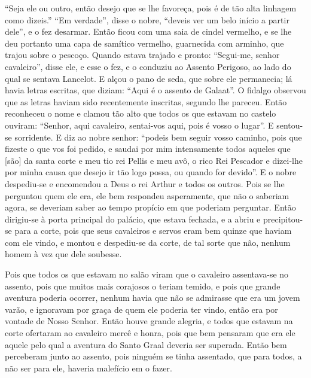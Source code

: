 “Seja ele ou outro, então desejo que se lhe favoreça, pois é de tão alta
linhagem como dizeis.” “Em verdade”, disse o nobre, “deveis ver um belo início
a partir dele”, e o fez desarmar. Então ficou com uma saia de cindel vermelho,
e se lhe deu portanto uma capa de samítico vermelho, guarnecida com arminho,
que trajou sobre o pescoço. Quando estava trajado e pronto: “Segui-me, senhor
cavaleiro”, disse ele, e esse o fez, e o conduziu ao Assento Perigoso, ao lado
do qual se sentava Lancelot. E alçou o pano de seda, que sobre ele permanecia;
lá havia letras escritas, que diziam: “Aqui é o assento de Galaat”. O fidalgo
observou que as letras haviam sido recentemente inscritas, segundo lhe pareceu.
Então reconheceu o nome e clamou tão alto que todos os que estavam no castelo
ouviram: “Senhor, aqui cavaleiro, sentai-vos aqui, pois é vosso o lugar”. E
sentou-se sorridente. E diz ao nobre senhor: “podeis bem seguir vosso caminho,
pois que fizeste o que vos foi pedido, e saudai por mim intensamente todos
aqueles que [são] da santa corte e meu tio rei Pellis e meu avô, o rico Rei Pescador
e dizei-lhe por minha causa que desejo ir tão logo possa, ou quando for
devido”. E o nobre despediu-se e encomendou a Deus o rei Arthur e todos os
outros.  Pois se lhe perguntou quem ele era, ele bem respondeu asperamente, que
não o saberiam agora, se deveriam saber ao tempo propício em que poderiam
perguntar. Então dirigiu-se à porta principal do palácio, que estava fechada, e
a abriu e precipitou-se para a corte, pois que seus cavaleiros e servos eram
bem quinze que haviam com ele vindo, e montou e despediu-se da corte, de tal
sorte que não, nenhum homem à vez que dele soubesse. 

Pois que todos os que estavam no salão viram que o cavaleiro assentava-se no
assento, pois que muitos mais corajosos o teriam temido, e pois que grande
aventura poderia ocorrer, nenhum havia que não se admirasse que era um jovem
varão, e ignoravam por graça de quem ele poderia ter vindo, então era por
vontade de Nosso Senhor. Então houve grande alegria, e todos que estavam na
corte ofertaram ao cavaleiro mercê e honra, pois que bem pensaram que era ele
aquele pelo qual a aventura do Santo Graal deveria ser superada. Então
bem perceberam junto ao assento, pois ninguém se tinha assentado, que para
todos, a não ser para ele, haveria malefício em o fazer. 

